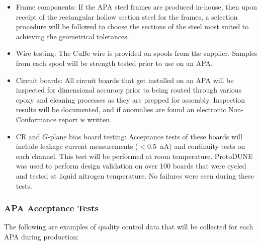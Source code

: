 \begin{itemize}

\item Frame components: If the APA steel frames are produced in-house, then upon receipt of the rectangular hollow section steel for the frames, a selection procedure will be followed to choose the sections of the steel most suited to achieving the geometrical tolerances. 

\item Wire testing: The CuBe wire is provided on spools from the supplier. Samples from each spool will be strength tested prior to use on an APA.

\item Circuit boards: All circuit boards that get installed on an APA will be inspected for dimensional accuracy prior to being routed through various epoxy and cleaning processes as they are prepped for assembly. Inspection results will be documented, and if anomalies are found an electronic Non-Conformance report is written.  %

\item CR and $G$-plane bias board testing: Acceptance tests of these boards will include leakage current measurements ($<$\SI{0.5}{nA}) and continuity tests on each channel.  This test will be performed at room temperature. ProtoDUNE was used to perform design validation on over 100 boards that were cycled and tested at liquid nitrogen temperature. No failures were seen during these tests. 

\end{itemize}

\subsubsection{APA Acceptance Tests} 

The following are examples of quality control data that will be collected for each APA during production:  

